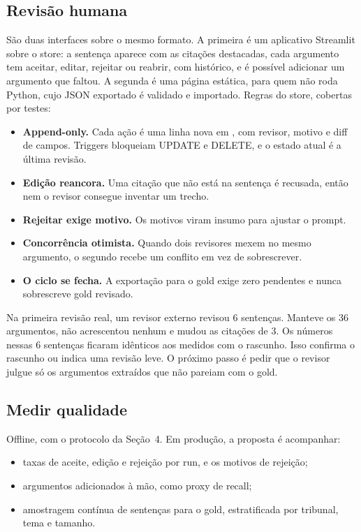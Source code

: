 \documentclass[11pt,a4paper]{article}
\newcommand{\cfg}[1]{\texttt{\detokenize{#1}}}
\begin{document}
\subsection{Revisão humana}\label{sec:q2-revisao}
São duas interfaces sobre o mesmo formato. A primeira é um aplicativo Streamlit sobre o store: a
sentença aparece com as citações destacadas, cada argumento tem aceitar, editar, rejeitar ou
reabrir, com histórico, e é possível adicionar um argumento que faltou. A segunda é uma página
estática, para quem não roda Python, cujo JSON exportado é validado e importado. Regras do store,
cobertas por testes:
\begin{itemize}
  \item \textbf{Append-only.} Cada ação é uma linha nova em \cfg{argument_revisions}, com revisor,
    motivo e diff de campos. Triggers bloqueiam UPDATE e DELETE, e o estado atual é a última
    revisão.
  \item \textbf{Edição reancora.} Uma citação que não está na sentença é recusada, então nem o
    revisor consegue inventar um trecho.
  \item \textbf{Rejeitar exige motivo.} Os motivos viram insumo para ajustar o prompt.
  \item \textbf{Concorrência otimista.} Quando dois revisores mexem no mesmo argumento, o segundo
    recebe um conflito em vez de sobrescrever.
  \item \textbf{O ciclo se fecha.} A exportação para o gold exige zero pendentes e nunca
    sobrescreve gold revisado.
\end{itemize}
Na primeira revisão real, um revisor externo revisou 6 sentenças. Manteve os 36 argumentos, não
acrescentou nenhum e mudou as citações de 3. Os números nessas 6 sentenças ficaram idênticos aos
medidos com o rascunho. Isso confirma o rascunho ou indica uma revisão leve. O próximo passo é
pedir que o revisor julgue só os argumentos extraídos que não pareiam com o gold.

\subsection{Medir qualidade}\label{sec:q2-qualidade}
Offline, com o protocolo da Seção~4. Em produção, a proposta é acompanhar:
\begin{itemize}
  \item taxas de aceite, edição e rejeição por run, e os motivos de rejeição;
  \item argumentos adicionados à mão, como proxy de recall;
  \item amostragem contínua de sentenças para o gold, estratificada por tribunal, tema e tamanho.
\end{itemize}
\end{document}
